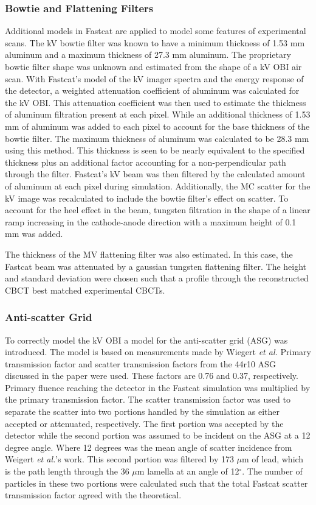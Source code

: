 \subsubsection{Bowtie and Flattening Filters}

Additional models in Fastcat are applied to model some features of experimental scans. The kV bowtie filter was known to have a minimum thickness of 1.53 mm aluminum and a maximum thickness of 27.3 mm aluminum. The proprietary bowtie filter shape was unknown and estimated from the shape of a kV OBI air scan. With Fastcat’s model of the kV imager spectra and the energy response of the detector, a weighted attenuation coefficient of aluminum was calculated for the kV OBI. This attenuation coefficient was then used to estimate the thickness of aluminum filtration present at each pixel. While an additional thickness of 1.53 mm of aluminum was added to each pixel to account for the base thickness of the bowtie filter. The maximum thickness of aluminum was calculated to be 28.3 mm using this method. This thickness is seen to be nearly equivalent to the specified thickness plus an additional factor accounting for a non-perpendicular path through the filter. Fastcat’s kV beam was then filtered by the calculated amount of aluminum at each pixel during simulation. Additionally, the MC scatter for the kV image was recalculated to include the bowtie filter’s effect on scatter. To account for the heel effect in the beam, tungsten filtration in the shape of a linear ramp increasing in the cathode-anode direction with a maximum height of 0.1 mm was added.

The thickness of the MV flattening filter was also estimated. In this case, the Fastcat beam was attenuated by a gaussian tungsten flattening filter. The height and standard deviation were chosen such that a profile through the reconstructed CBCT best matched experimental CBCTs.

\subsubsection{Anti-scatter Grid}

To correctly model the kV OBI a model for the anti-scatter grid (ASG) was introduced. The model is based on measurements made by Wiegert \textit{et al.} \cite{Wiegert2004PerformanceCT} Primary transmission factor and scatter transmission factors from the 44r10 ASG discussed in the paper were used. These factors are 0.76 and 0.37, respectively. Primary fluence reaching the detector in the Fastcat simulation was multiplied by the primary transmission factor. The scatter transmission factor was used to separate the scatter into two portions handled by the simulation as either accepted or attenuated, respectively. The first portion was accepted by the detector while the second portion was assumed to be incident on the ASG at a 12 degree angle. Where 12 degrees was the mean angle of scatter incidence from Weigert \textit{et al.}’s work. This second portion was filtered by 173 $\mu$m of lead, which is the path length through the 36 $\mu$m lamella at an angle of 12$^\circ$. The number of particles in these two portions were calculated such that the total Fastcat scatter transmission factor agreed with the theoretical.

